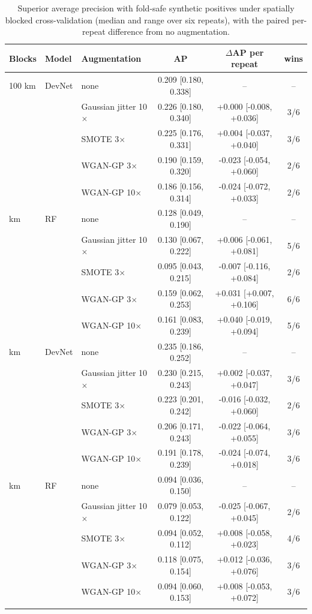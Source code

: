 \documentclass[pdflatex,sn-apa]{sn-jnl}
\begin{document}
\begin{appendices}
\begin{table}[!h]
\caption{Superior average precision with fold-safe synthetic positives under spatially blocked cross-validation (median and range over six repeats), with the paired per-repeat difference from no augmentation.}\label{tab:aug-spatial}
\footnotesize
\begin{tabular*}{\textwidth}{@{\extracolsep\fill}lllccc}
\toprule
Blocks & Model & Augmentation & AP & $\Delta$AP per repeat & wins \\
\midrule
100 km & DevNet & none & 0.209 [0.180, 0.338] & -- & -- \\
 &  & Gaussian jitter 10$\times$ & 0.226 [0.180, 0.340] & +0.000 [-0.008, +0.036] & 3/6 \\
 &  & SMOTE 3$\times$ & 0.225 [0.176, 0.331] & +0.004 [-0.037, +0.040] & 3/6 \\
 &  & WGAN-GP 3$\times$ & 0.190 [0.159, 0.320] & -0.023 [-0.054, +0.060] & 2/6 \\
 &  & WGAN-GP 10$\times$ & 0.186 [0.156, 0.314] & -0.024 [-0.072, +0.033] & 2/6 \\
\addlinespace
100 km & RF & none & 0.128 [0.049, 0.190] & -- & -- \\
 &  & Gaussian jitter 10$\times$ & 0.130 [0.067, 0.222] & +0.006 [-0.061, +0.081] & 5/6 \\
 &  & SMOTE 3$\times$ & 0.095 [0.043, 0.215] & -0.007 [-0.116, +0.084] & 2/6 \\
 &  & WGAN-GP 3$\times$ & 0.159 [0.062, 0.253] & +0.031 [+0.007, +0.106] & 6/6 \\
 &  & WGAN-GP 10$\times$ & 0.161 [0.083, 0.239] & +0.040 [-0.019, +0.094] & 5/6 \\
\addlinespace
200 km & DevNet & none & 0.235 [0.186, 0.252] & -- & -- \\
 &  & Gaussian jitter 10$\times$ & 0.230 [0.215, 0.243] & +0.002 [-0.037, +0.047] & 3/6 \\
 &  & SMOTE 3$\times$ & 0.223 [0.201, 0.242] & -0.016 [-0.032, +0.060] & 2/6 \\
 &  & WGAN-GP 3$\times$ & 0.206 [0.171, 0.243] & -0.022 [-0.064, +0.055] & 3/6 \\
 &  & WGAN-GP 10$\times$ & 0.191 [0.178, 0.239] & -0.024 [-0.074, +0.018] & 3/6 \\
\addlinespace
200 km & RF & none & 0.094 [0.036, 0.150] & -- & -- \\
 &  & Gaussian jitter 10$\times$ & 0.079 [0.053, 0.122] & -0.025 [-0.067, +0.045] & 2/6 \\
 &  & SMOTE 3$\times$ & 0.094 [0.052, 0.112] & +0.008 [-0.058, +0.023] & 4/6 \\
 &  & WGAN-GP 3$\times$ & 0.118 [0.075, 0.154] & +0.012 [-0.036, +0.076] & 3/6 \\
 &  & WGAN-GP 10$\times$ & 0.094 [0.060, 0.153] & +0.008 [-0.053, +0.072] & 3/6 \\
\botrule
\end{tabular*}
\end{table}


\end{appendices}
\end{document}
